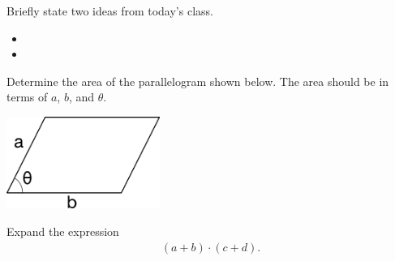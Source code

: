 \begin{problem}
\item Briefly state two ideas from today's class.
  \begin{itemize}
  \item
  \item
  \end{itemize}
\item
  \begin{subproblem}
    \item
  \end{subproblem}
\end{problem}



\begin{problem}
\item Determine the area of the parallelogram shown below. The area
  should be in terms of $a$, $b$, and $\theta$.

  \includegraphics[width=5cm]{ink/week11/parallelogram}

  \vfill

\item Expand the expression
  \begin{eqnarray*}
    \left( a + b \right) \cdot \left( c + d \right).
  \end{eqnarray*}

  \vfill

\end{problem}


